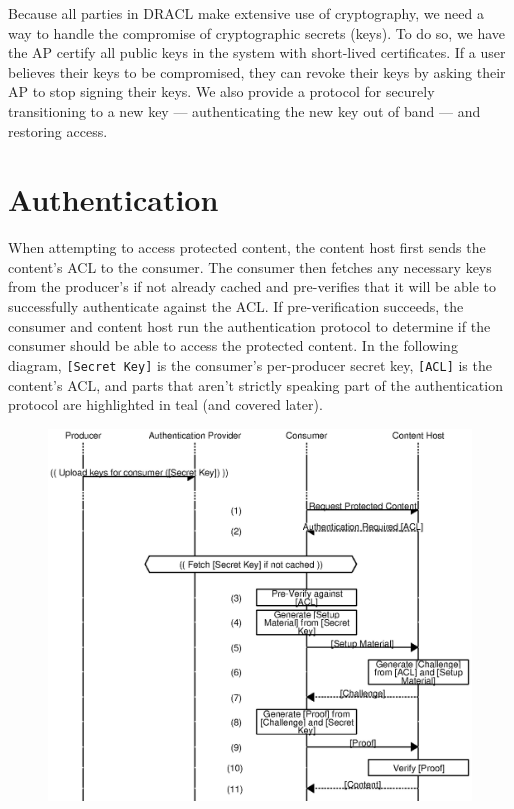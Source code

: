 \documentclass[pdftex,12pt,a4papaer,twoside,notitlepage]{report}
\begin{document}
Because all parties in DRACL make extensive use of cryptography, we need a way
to handle the compromise of cryptographic secrets (keys). To do so, we have the
AP certify all public keys in the system with short-lived certificates. If a
user believes their keys to be compromised, they can revoke their keys by asking
their AP to stop signing their keys. We also provide a protocol for securely
transitioning to a new key --- authenticating the new key out of band --- and
restoring access.

\section{Authentication}
\label{sub:authentication}

When attempting to access protected content, the content host first sends the
content's ACL to the consumer. The consumer then fetches any necessary keys from
the producer's if not already cached and pre-verifies that it will be able to
successfully authenticate against the ACL. If pre-verification succeeds, the
consumer and content host run the authentication protocol to determine if the
consumer should be able to access the protected content. In the following
diagram, \verb=[Secret Key]= is the consumer's per-producer secret key,
\verb=[ACL]= is the content's ACL, and parts that aren't strictly speaking part
of the authentication protocol are highlighted in teal (and covered later).

\begin{figure}[H]
    \includegraphics{auth.eps}
\end{figure}
\end{document}
